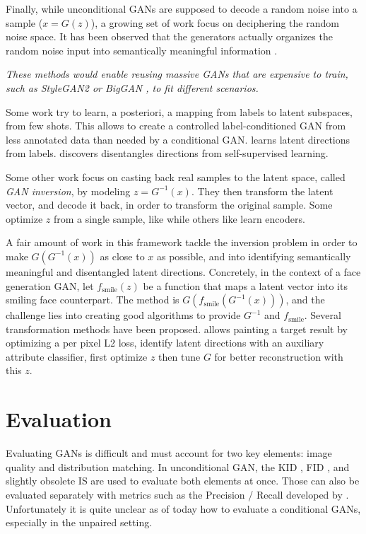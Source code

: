 Finally, while unconditional GANs are supposed to decode a random noise into a sample ($x=G(z)$), a growing set of work focus on deciphering the random noise space. It has been observed that the generators actually organizes the random noise input into semantically meaningful information \citep{bigan,bigbigan}.

\emph{These methods would enable reusing massive GANs that are expensive to train, such as StyleGAN2 \cite{stylegan2} or BigGAN \cite{biggan}, to fit different scenarios.}

Some work try to learn, a posteriori, a mapping from labels to latent subspaces, from few shots. This allows to create a controlled label-conditioned GAN from less annotated data than needed by a conditional GAN. \citet{interpretingz} learns latent directions from labels. \citet{ganspace} discovers disentangles directions from self-supervised learning.

Some other work focus on casting back real samples to the latent space, called \emph{GAN inversion}, by modeling $z=G^{-1}(x)$. They then transform the latent vector, and decode it back, in order to transform the original sample. Some optimize $z$ from a single sample, like \citet{inverting} while others like \citet{collaborativeembedding} learn encoders.

A fair amount of work in this framework tackle the inversion problem in order to make $G(G^{-1}(x))$ as close to $x$ as possible, and into identifying semantically meaningful and disentangled latent directions. Concretely, in the context of a face generation GAN, let $f_\text{smile}(z)$ be a function that maps a latent vector into its smiling face counterpart. The method is $G(f_\text{smile}(G^{-1}(x)))$, and the challenge lies into creating good algorithms to provide $G^{-1}$ and $f_\text{smile}$. Several transformation methods have been proposed. \citet{neuralphotoeditor} allows painting a target result by optimizing a per pixel L2 loss, \citet{interfacegan} identify latent directions with an auxiliary attribute classifier, \citet{pivotaltuning} first optimize $z$ then tune $G$ for better reconstruction with this $z$.

\section{Evaluation}

Evaluating GANs is difficult and must account for two key elements: image quality and distribution matching. In unconditional \ac{GAN}, the \ac{KID} \citep{kid}, \ac{FID} \citep{fid}, and slightly obsolete \ac{IS} \citep{inceptionscore} are used to evaluate both elements at once. Those can also be evaluated separately with metrics such as the  Precision / Recall developed by \citet{precisionrecall}. Unfortunately it is quite unclear as of today how to evaluate a conditional \acp{GAN}, especially in the unpaired setting.

